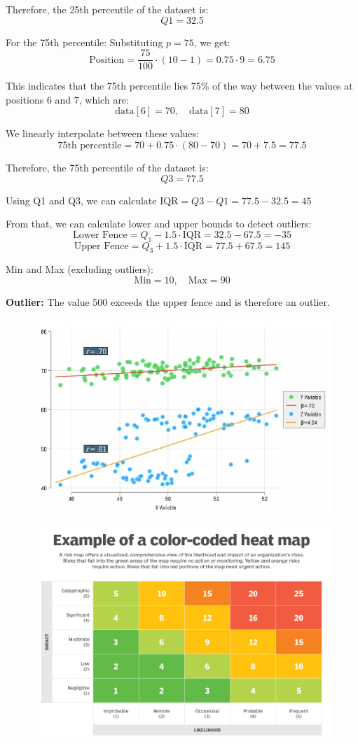 \documentclass{article}
\begin{document}
Therefore, the 25th percentile of the dataset is:
\[
\boxed{Q1 = 32.5}
\]

For the 75th percentile:
Substituting \(p = 75\), we get:
\[
\text{Position} = \frac{75}{100} \cdot (10 - 1) = 0.75 \cdot 9 = 6.75
\]

This indicates that the 75th percentile lies 75\% of the way between the values at positions 6 and 7, which are:
\[
\text{data}[6] = 70, \quad \text{data}[7] = 80
\]

We linearly interpolate between these values:
\[
\text{75th percentile} = 70 + 0.75 \cdot (80 - 70) = 70 + 7.5 = 77.5
\]

Therefore, the 75th percentile of the dataset is:
\[
\boxed{Q3 = 77.5}
\]

Using Q1 and Q3, we can calculate $\text{IQR} = Q3 - Q1 = 77.5 - 32.5 = 45$

From that, we can calculate lower and upper bounds to detect outliers:
\[
\text{Lower Fence} = Q_1 - 1.5 \cdot \text{IQR} = 32.5 - 67.5 = -35
\]
\[
\text{Upper Fence} = Q_3 + 1.5 \cdot \text{IQR} = 77.5 + 67.5 = 145
\]

Min and Max (excluding outliers):
\[
\text{Min} = 10, \quad \text{Max} = 90
\]

\textbf{Outlier:} The value 500 exceeds the upper fence and is therefore an outlier.



\begin{figure}[H]
\includegraphics[width=0.5\linewidth]{images/scatterplot.png}
\end{figure}

\begin{figure}[H]
    \includegraphics[width=0.5\linewidth]{images/heatmap.png}
\end{figure}
\end{document}
